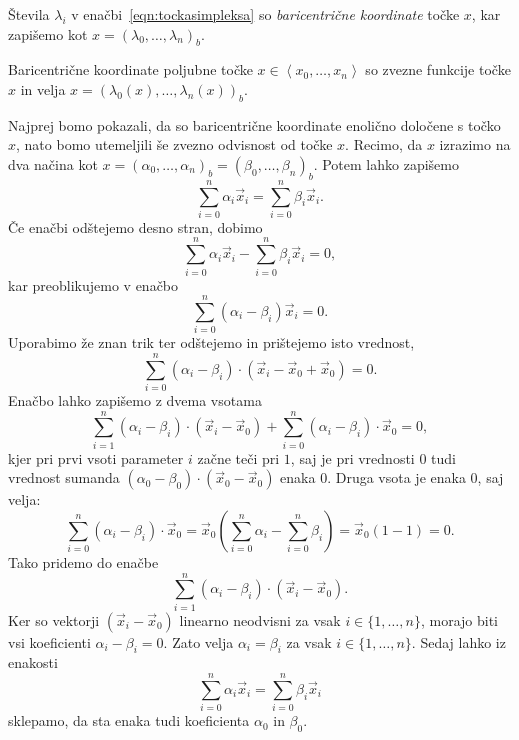 \documentclass[mat1]{fmfdelo}
\newcommand{\0}{\underline{0}}
\begin{document}
Števila $\lambda_i$ v enačbi~\eqref{eqn:tockasimpleksa} so \emph{baricentrične koordinate} točke $x$, kar zapišemo kot $x = (\lambda_0, \dots, \lambda_n)_b$.
\begin{trditev}\label{trd:zveznost-baricentra}
Baricentrične koordinate poljubne točke $x \in \left <x_0, \dots, x_n \right >$ so zvezne funkcije točke $x$ in velja $x = (\lambda_0(x), \dots, \lambda_n(x))_b$.
\end{trditev}
\begin{dokaz}
Najprej bomo pokazali, da so baricentrične koordinate enolično določene s točko $x$, nato bomo utemeljili še zvezno odvisnost od točke $x$. Recimo, da $x$ izrazimo na dva načina kot $x = \left (\alpha_0, \dots, \alpha_n \right )_b = \left (\beta_0, \dots, \beta_n \right )_b$. Potem lahko zapišemo 
$$\sum_{i=0}^n \alpha_i \vec{x}_i = \sum_{i=0}^n \beta_i \vec{x}_i.$$
Če enačbi odštejemo desno stran, dobimo 
$$\sum_{i=0}^n \alpha_i \vec{x}_i - \sum_{i=0}^n \beta_i \vec{x}_i = 0,$$
kar preoblikujemo v enačbo
$$\sum_{i=0}^n (\alpha_i - \beta_i) \vec{x}_i  = 0.$$
Uporabimo že znan trik ter odštejemo in prištejemo isto vrednost,
$$\sum_{i=0}^n (\alpha_i  - \beta_i) \cdot (\vec{x}_i - \vec{x}_0 + \vec{x}_0) = 0.$$
Enačbo lahko zapišemo z dvema vsotama
$$\sum_{i=1}^n (\alpha_i  - \beta_i) \cdot (\vec{x}_i -\vec{x}_0) + \sum_{i=0}^n (\alpha_i  - \beta_i) \cdot \vec{x}_0= 0,$$
kjer pri prvi vsoti parameter $i$ začne teči pri $1$, saj je pri vrednosti $0$ tudi vrednost sumanda  $(\alpha_0 - \beta_0) \cdot (\vec{x}_0 -\vec{x}_0)$ enaka $0$. Druga vsota je enaka $0$, saj velja:
$$\sum_{i=0}^n (\alpha_i  - \beta_i) \cdot \vec{x}_0= \vec{x}_0 \left (\sum_{i=0}^n \alpha_i  - \sum_{i=0}^n \beta_i \right) = \vec{x}_0 (1 - 1)= 0.$$
Tako pridemo do enačbe 
$$\sum_{i=1}^n (\alpha_i  - \beta_i) \cdot (\vec{x}_i - \vec{x}_0).$$
Ker so vektorji $(\vec{x}_i - \vec{x}_0)$ linearno neodvisni za vsak $i \in \{ 1, \dots, n \}$, morajo biti vsi koeficienti $\alpha_i  - \beta_i = 0$. Zato velja $\alpha_i  = \beta_i$ za vsak $i \in \{ 1, \dots, n \}$. Sedaj lahko iz enakosti
$$\sum_{i=0}^n \alpha_i \vec{x}_i = \sum_{i=0}^n \beta_i \vec{x}_i$$
sklepamo, da sta enaka tudi koeficienta $\alpha_0$ in $\beta_0$.


\end{dokaz}
\end{document}

